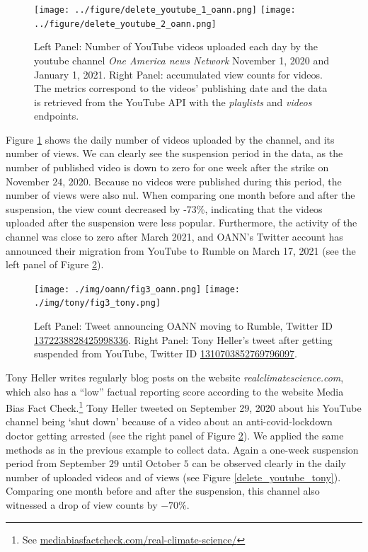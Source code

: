 \documentclass{article}
\begin{document}
\begin{figure}[h]
\hspace{-2em}
		\texttt{[image: ../figure/delete\_youtube\_1\_oann.png]}
		\texttt{[image: ../figure/delete\_youtube\_2\_oann.png]} 
	\caption{Left Panel: Number of YouTube videos uploaded each day by the youtube channel {\it One America news Network} November 1, 2020 and January 1, 2021. Right Panel: accumulated view counts for videos. The metrics correspond to the videos’  publishing date and the data is retrieved from the YouTube API with the {\it playlists} and  {\it videos} endpoints. }
	\label{delete_youtube_oann}
\end{figure}

\smallskip

Figure \ref{delete_youtube_oann} shows the daily number of videos uploaded by the channel, and its number of views. 
We can clearly see the suspension period in the data, as the number of published video is down to zero for one week after the strike on November $24$, $2020$. 
Because no videos were published during this period, the number of views were also nul.
When comparing one month before and after the suspension, the view count decreased by -73\%, indicating that the videos uploaded after the suspension were less popular. 
Furthermore, the activity of the channel was close to zero after March 2021, and OANN's Twitter account has announced their migration from YouTube to Rumble on March 17, 2021 (see the left panel of Figure \ref{tweets_about_yt_suspensions}).

\begin{figure}[h]
	\centering
		\texttt{[image: ./img/oann/fig3\_oann.png]}
		\texttt{[image: ./img/tony/fig3\_tony.png]}
	\caption{Left Panel: Tweet announcing OANN moving to Rumble, Twitter ID \href{https://twitter.com/OANN/status/1372238828425998336}{1372238828425998336}. Right Panel: Tony Heller's tweet after getting suspended from YouTube, Twitter ID \href{https://twitter.com/Tony\_Heller/status/1310703852769796097}{1310703852769796097}.}
	\label{tweets_about_yt_suspensions}
\end{figure}

\smallskip

Tony Heller writes regularly blog posts on the website {\it realclimatescience.com}, which also has a ``low'' factual reporting score according to the website Media Bias Fact Check.\footnote{See \href{https://mediabiasfactcheck.com/real-climate-science/}{mediabiasfactcheck.com/real-climate-science/}}
Tony Heller tweeted on September 29, 2020 about his YouTube channel being `shut down' because of a video about an anti-covid-lockdown doctor getting arrested (see the right panel of Figure \ref{tweets_about_yt_suspensions}).
We applied the same methods as in the previous example to collect data.
Again a one-week suspension period from September $29$ until October $5$ can be observed clearly in the daily number of uploaded videos and of views (see Figure \ref{delete_youtube_tony}).
Comparing one month before and after the suspension, this channel also witnessed a drop of view counts by $-70\%$.
\end{document}

